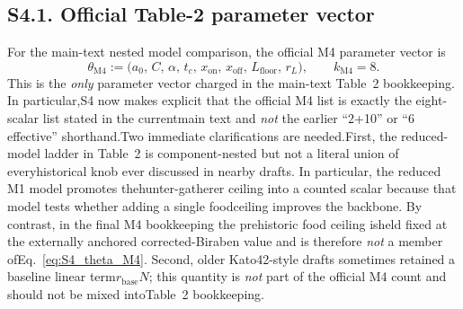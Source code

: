\documentclass[11pt]{article}
\begin{document}
\subsection*{S4.1. Official Table-2 parameter vector}\label{subsec:S4_official_vector}
For the main-text nested model comparison, the official M4 parameter vector is
\begin{equation}\theta_{\mathrm{M4}}:=\bigl(a_0,\,C,\,\alpha,\,t_c,\,x_{\mathrm{on}},\,x_{\mathrm{off}},\,L_{\mathrm{floor}},\,r_L\bigr),\qquad k_{\mathrm{M4}}=8.\tag{S4.1}\label{eq:S4_theta_M4}\end{equation}
This is the \emph{only} parameter vector charged in the main-text Table~2 bookkeeping. In particular,S4 now makes explicit that the official M4 list is exactly the eight-scalar list stated in the currentmain text and \emph{not} the earlier ``2+10'' or ``6 effective'' shorthand.Two immediate clarifications are needed.First, the reduced-model ladder in Table~2 is component-nested but not a literal union of everyhistorical knob ever discussed in nearby drafts. In particular, the reduced M1 model promotes thehunter-gatherer ceiling into a counted scalar because that model tests whether adding a single foodceiling improves the backbone. By contrast, in the final M4 bookkeeping the prehistoric food ceiling isheld fixed at the externally anchored corrected-Biraben value and is therefore \emph{not} a member ofEq.~\eqref{eq:S4_theta_M4}. Second, older Kato42-style drafts sometimes retained a baseline linear term$r_{\mathrm{base}}N$; this quantity is \emph{not} part of the official M4 count and should not be mixed intoTable~2 bookkeeping.
\end{document}
